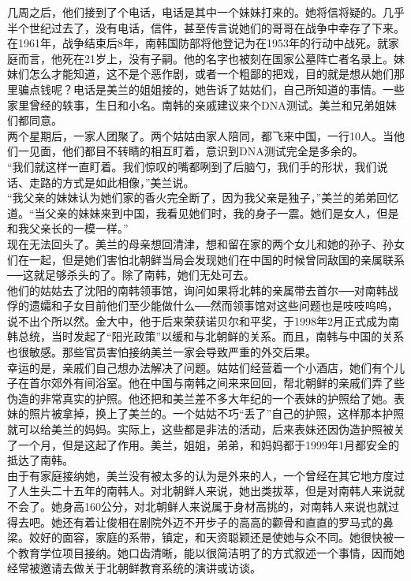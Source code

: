 几周之后，他们接到了个电话，电话是其中一个妹妹打来的。她将信将疑的。几乎半个世纪过去了，没有电话，信件，甚至传言说她们的哥哥在战争中幸存了下来。在1961年，战争结束后8年，南韩国防部将他登记为在1953年的行动中战死。就家庭而言，他死在21岁上，没有子嗣。他的名字也被刻在国家公墓阵亡者名录上。妹妹们怎么才能知道，这不是个恶作剧，或者一个粗鄙的把戏，目的就是想从她们那里骗点钱呢？电话是美兰的姐姐接的，她告诉了姑姑们，自己所知道的事情。一些家里曾经的轶事，生日和小名。南韩的亲戚建议来个DNA测试。美兰和兄弟姐妹们都同意。\\

两个星期后，一家人团聚了。两个姑姑由家人陪同，都飞来中国，一行10人。当他们一见面，他们都目不转睛的相互盯着，意识到DNA测试完全是多余的。\\

“我们就这样一直盯着。我们惊叹的嘴都咧到了后脑勺，我们手的形状，我们说话、走路的方式是如此相像，”美兰说。\\

“我父亲的妹妹认为她们家的香火完全断了，因为我父亲是独子，”美兰的弟弟回忆道。“当父亲的妹妹来到中国，我看见她们时，我的身子一震。她们是女人，但是和我父亲长的一模一样。”\\

现在无法回头了。美兰的母亲想回清津，想和留在家的两个女儿和她的孙子、孙女们在一起，但是她们害怕北朝鲜当局会发现她们在中国的时候曾同敌国的亲属联系──这就足够杀头的了。除了南韩，她们无处可去。\\

他们的姑姑去了沈阳的南韩领事馆，询问如果将北韩的亲属带去首尔──对南韩战俘的遗孀和子女目前他们至少能做什么──然而领事馆对这些问题也是吱吱呜呜，说不出个所以然。金大中，他于后来荣获诺贝尔和平奖，于1998年2月正式成为南韩总统，当时发起了“阳光政策”以缓和与北朝鲜的关系。而且，南韩与中国的关系也很敏感。那些官员害怕接纳美兰一家会导致严重的外交后果。\\

幸运的是，亲戚们自己想办法解决了问题。姑姑们经营着一个小酒店，她们有个儿子在首尔郊外有间浴室。他在中国与南韩之间来来回回，帮北朝鲜的亲戚们弄了些伪造的非常真实的护照。他还把和美兰差不多大年纪的一个表妹的护照给了她。表妹的照片被拿掉，换上了美兰的。一个姑姑不巧“丢了”自己的护照，这样那本护照就可以给美兰的妈妈。实际上，这些都是非法的活动，后来表妹还因伪造护照被关了一个月，但是这起了作用。美兰，姐姐，弟弟，和妈妈都于1999年1月都安全的抵达了南韩。\\

由于有家庭接纳她，美兰没有被太多的认为是外来的人，一个曾经在其它地方度过了人生头二十五年的南韩人。对北朝鲜人来说，她出类拔萃，但是对南韩人来说就不会了。她身高160公分，对北朝鲜人来说属于身材高挑的，对南韩人来说也就过得去吧。她还有着让俊相在剧院外迈不开步子的高高的颧骨和直直的罗马式的鼻梁。姣好的面容，家庭的系带，镇定，和天资聪颖还是使她与众不同。她很快被一个教育学位项目接纳。她口齿清晰，能以很简洁明了的方式叙述一个事情，因而她经常被邀请去做关于北朝鲜教育系统的演讲或访谈。\\

